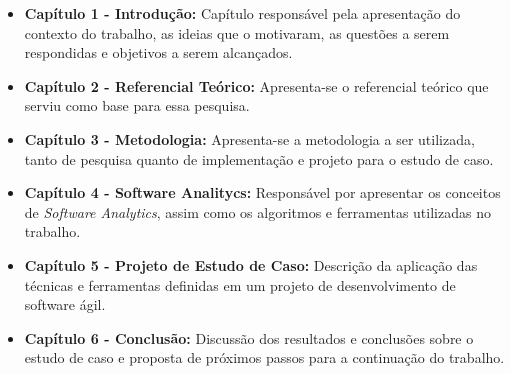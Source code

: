 \begin{itemize}
    \item \textbf{Capítulo 1 - Introdução:} Capítulo responsável pela apresentação do contexto do trabalho, as ideias que o motivaram, as questões a serem respondidas e objetivos a serem alcançados.
    \item \textbf{Capítulo 2 - Referencial Teórico:} Apresenta-se o referencial teórico que serviu como base para essa pesquisa.
    \item \textbf{Capítulo 3 - Metodologia:} Apresenta-se a metodologia a ser utilizada, tanto de pesquisa quanto de implementação e projeto para o estudo de caso.
    \item \textbf{Capítulo 4 - Software Analitycs:} Responsável por apresentar os conceitos de \textit{Software Analytics}, assim como os algoritmos e ferramentas utilizadas no trabalho.
    \item \textbf{Capítulo 5 - Projeto de Estudo de Caso:} Descrição da aplicação das técnicas e ferramentas definidas em um projeto de desenvolvimento de software ágil.
    \item \textbf{Capítulo 6 - Conclusão:} Discussão dos resultados e conclusões sobre o estudo de caso e proposta de próximos passos para a continuação do trabalho.
\end{itemize}
